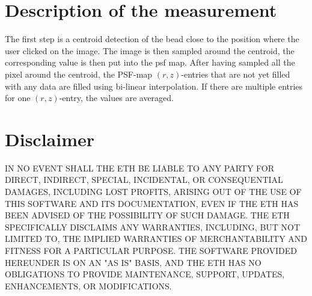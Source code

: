 \documentclass{scrartcl}
\begin{document}
\section{Description of the measurement}
The first step is a centroid detection \cite{sbalzarini} of the bead close to the position where the user clicked on the image. 
The image is then sampled around the centroid, the corresponding value is then put into the psf map.
After having sampled all the pixel around the centroid, the PSF-map $(r,z)$-entries that are not yet filled with any data are filled using bi-linear interpolation. If there are multiple entries for one $(r,z)$-entry, the values are averaged.

\section{Disclaimer}
IN NO EVENT SHALL THE ETH BE LIABLE TO ANY PARTY FOR DIRECT, INDIRECT, SPECIAL, INCIDENTAL, OR CONSEQUENTIAL DAMAGES, INCLUDING LOST PROFITS, ARISING OUT OF THE USE OF THIS SOFTWARE AND ITS DOCUMENTATION, EVEN IF THE ETH HAS BEEN ADVISED OF THE POSSIBILITY OF SUCH DAMAGE. THE ETH SPECIFICALLY DISCLAIMS ANY WARRANTIES, INCLUDING, BUT NOT LIMITED TO, THE IMPLIED WARRANTIES OF MERCHANTABILITY AND FITNESS FOR A PARTICULAR PURPOSE. THE SOFTWARE PROVIDED HEREUNDER IS ON AN "AS IS" BASIS, AND THE ETH HAS NO OBLIGATIONS TO PROVIDE MAINTENANCE, SUPPORT, UPDATES, ENHANCEMENTS, OR MODIFICATIONS.



\end{document}
